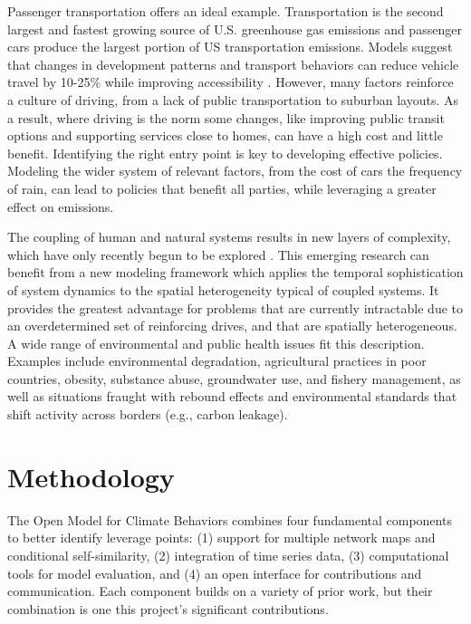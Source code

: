 \documentclass[12pt, oneside]{amsart}
\begin{document}
Passenger transportation offers an ideal example.  Transportation is the second largest and fastest growing source of U.S. greenhouse gas emissions and passenger cars produce the largest portion of US transportation emissions.  Models suggest that changes in development patterns and transport behaviors can reduce vehicle travel by 10-25\% while improving accessibility \citep{greene2011reducing}.  However, many factors reinforce a culture of driving, from a lack of public transportation to suburban layouts.  As a result, where driving is the norm some changes, like improving public transit options and supporting services close to homes, can have a high cost and little benefit.  Identifying the right entry point is key to developing effective policies.  Modeling the wider system of relevant factors, from the cost of cars the frequency of rain, can lead to policies that benefit all parties, while leveraging a greater effect on emissions.  

The coupling of human and natural systems results in new layers of complexity, which have only recently begun to be explored \citep{liu2007complexity}.  This emerging research can benefit from a new modeling framework which applies the temporal sophistication of system dynamics to the spatial heterogeneity typical of coupled systems.  It provides the greatest advantage for problems that are currently intractable due to an overdetermined set of reinforcing drives, and that are spatially heterogeneous.  A wide range of environmental and public health issues fit this description.  Examples include environmental degradation, agricultural practices in poor countries, obesity, substance abuse, groundwater use, and fishery management, as well as situations fraught with rebound effects \cite[as in][]{greening2000energy} and environmental standards that shift activity across borders (e.g., carbon leakage).

\section*{Methodology}

The Open Model for Climate Behaviors combines four fundamental components to better identify leverage points: (1) support for multiple network maps and conditional self-similarity, (2) integration of time series data, (3) computational tools for model evaluation, and (4) an open interface for contributions and communication.  Each component builds on a variety of prior work, but their combination is one this project's significant contributions.
\end{document}

